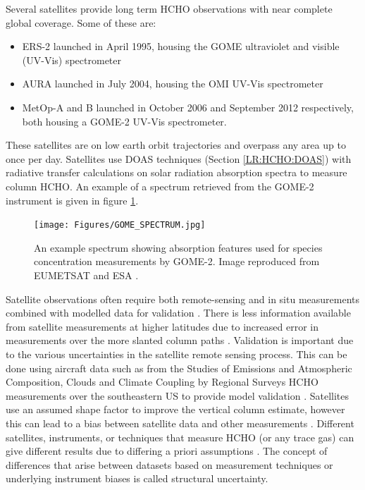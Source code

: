       Several satellites provide long term HCHO observations with near complete global coverage. 
      Some of these are:
      \begin{itemize}
        \item  ERS-2 launched in April 1995, housing the GOME ultraviolet and visible (UV-Vis) spectrometer
        \item AURA launched in July 2004, housing the OMI UV-Vis spectrometer
        \item MetOp-A and B launched in October 2006 and September 2012 respectively, both housing a GOME-2 UV-Vis spectrometer.
      \end{itemize}
      These satellites are on low earth orbit trajectories and overpass any area up to once per day.
      Satellites use DOAS techniques (Section \ref{LR:HCHO:DOAS}) with radiative transfer calculations on solar radiation absorption spectra to measure column HCHO.
      An example of a spectrum retrieved from the GOME-2 instrument is given in figure \ref{LR:HCHO:Sat:fig_GOME_products}.
      
      \begin{figure}
        \texttt{[image: Figures/GOME\_SPECTRUM.jpg]}
        \caption{%
          An example spectrum showing absorption features used for species concentration measurements by GOME-2. Image reproduced from EUMETSAT and ESA \parencite{GOME2Image}.
          }
        \label{LR:HCHO:Sat:fig_GOME_products}
      \end{figure}
      
      Satellite observations often require both remote-sensing and in situ measurements combined with modelled data for validation \parencite{Marais2014}.
      There is less information available from satellite measurements at higher latitudes due to increased error in measurements over the more slanted column paths \parencite{DeSmedt2015}.
      Validation is important due to the various uncertainties in the satellite remote sensing process.
      This can be done using aircraft data such as from the Studies of Emissions and Atmospheric Composition, Clouds and Climate Coupling by Regional Surveys HCHO measurements over the southeastern US to provide model validation 
      \parencite[e.g.,][]{Zhu2016}. 
      Satellites use an assumed shape factor to improve the vertical column estimate, however this can lead to a bias between satellite data and other measurements \parencite{Zhu2016}.
      Different satellites, instruments, or techniques that measure HCHO (or any trace gas) can give different results due to differing a priori assumptions \parencite{Lorente2017}.
      The concept of differences that arise between datasets based on measurement techniques or underlying instrument biases is called structural uncertainty.
      
